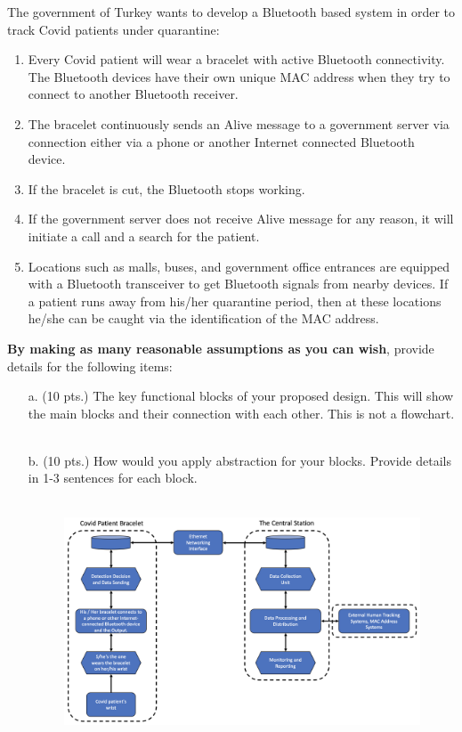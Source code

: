 \documentclass[a4paper, 11pt]{report}
\begin{document}
{The government of Turkey wants to develop a Bluetooth based system in order to track
Covid patients under quarantine:
\begin{enumerate}
\item Every Covid patient will wear a bracelet with active Bluetooth connectivity. The
Bluetooth devices have their own unique MAC address when they try to connect to
another Bluetooth receiver.
\item The bracelet continuously sends an Alive message to a government server via connection
either via a phone or another Internet connected Bluetooth device.
\item If the bracelet is cut, the Bluetooth stops working.
\item If the government server does not receive Alive message for any reason, it will initiate
a call and a search for the patient.
\item Locations such as malls, buses, and government office entrances are equipped with a
Bluetooth transceiver to get Bluetooth signals from nearby devices. If a patient runs
away from his/her quarantine period, then at these locations he/she can be caught via
the identification of the MAC address.
\end{enumerate}
\textbf{By making as many reasonable assumptions as you can wish}, provide details for the
following items:
\begin{enumerate}
\item[a.] (10 pts.) The key functional blocks of your proposed design. This will show the main
blocks and their connection with each other. This is not a flowchart.
\\ \\
{\color{blue}{There is no unique approach here. However, most of the main blocks given in Figure 1 are expected.}}
\item[b.] (10 pts.) How would you apply abstraction for your blocks. Provide details in 1-3 sentences for each block.
\\ \\
{\color{blue}{Each subblock is abstracted with minimal data transfer and the internal processing of each block is encapsulated. The following abstraction can be applied for each module. You can view Figure 1 below.}}
\begin{figure}[h]
\includegraphics[scale=.33]{1.png}

\end{figure}
\end{enumerate}}
\end{document}
